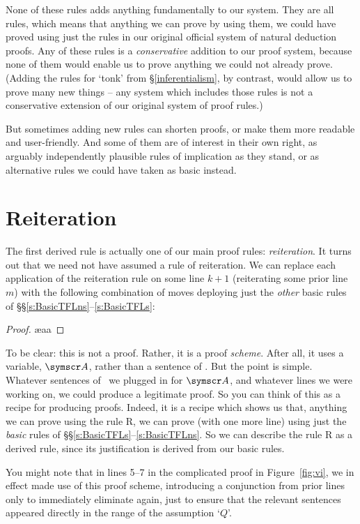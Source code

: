 None of these rules adds anything fundamentally to our system. They are all  rules, which means that anything we can prove by using them, we could have proved using just the rules in our original official system of natural deduction proofs. Any of these rules is a \emph{conservative} addition to our proof system, because none of them would enable us to prove anything we could not already prove. (Adding the rules for `tonk' from §\ref{inferentialism}, by contrast, would allow us to prove many new things – any system which includes those rules is not a conservative extension of our original system of proof rules.)

 But sometimes adding new rules can shorten proofs, or make them more readable and user-friendly. And some of them are of interest in their own right, as arguably independently plausible rules of implication as they stand, or as alternative rules we could have taken as basic instead.

\section{Reiteration}\label{der.reit}
The first derived rule is actually one of our main proof rules: \emph{reiteration}. It turns out that we need not have assumed a rule of reiteration. We can replace each application of the reiteration rule on some line $k+1$ (reiterating some prior line $m$) with the following combination of moves deploying just the \emph{other} basic rules of §§\ref{s:BasicTFLns}–\ref{s:BasicTFLs}:
\begin{proof}
	\ae{aa}
\end{proof}
To be clear: this is not a proof. Rather, it is a proof \emph{scheme}. After all, it uses a variable, $\meta{A}$, rather than a sentence of \TFL. But the point is simple. Whatever sentences of \TFL\ we plugged in for $\meta{A}$, and whatever lines we were working on, we could produce a legitimate proof. So you can think of this as a recipe for producing proofs. Indeed, it is a recipe which shows us that, anything we can prove using the rule R, we can prove (with one more line) using just the \emph{basic} rules of §§\ref{s:BasicTFLs}–\ref{s:BasicTFLns}. So we can describe the rule R as a derived rule, since its justification is derived from our basic rules.

You might note that in lines 5–7 in the complicated proof in Figure~\ref{fig:vi}, we in effect made use of this proof scheme, introducing a conjunction from prior lines only to immediately eliminate again, just to ensure that the relevant sentences appeared directly in the range of the assumption `$Q$'.

